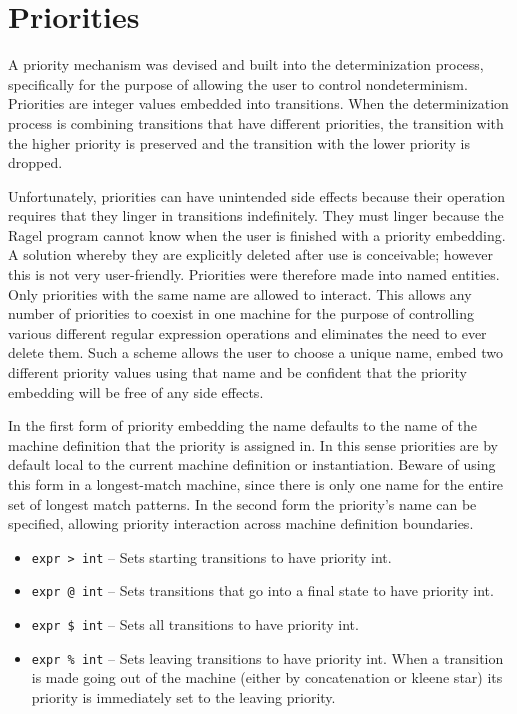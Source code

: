 \documentclass[letterpaper,11pt,oneside]{book}
\begin{document}
\section{Priorities}

A priority mechanism was devised and built into the determinization
process, specifically for the purpose of allowing the user to control
nondeterminism.  Priorities are integer values embedded into transitions. When
the determinization process is combining transitions that have different
priorities, the transition with the higher priority is preserved and the
transition with the lower priority is dropped.

Unfortunately, priorities can have unintended side effects because their
operation requires that they linger in transitions indefinitely. They must linger
because the Ragel program cannot know when the user is finished with a priority
embedding.  A solution whereby they are explicitly deleted after use is
conceivable; however this is not very user-friendly.  Priorities were therefore
made into named entities. Only priorities with the same name are allowed to
interact.  This allows any number of priorities to coexist in one machine for
the purpose of controlling various different regular expression operations and
eliminates the need to ever delete them. Such a scheme allows the user to
choose a unique name, embed two different priority values using that name
and be confident that the priority embedding will be free of any side effects.

In the first form of priority embedding the name defaults to the name of the machine
definition that the priority is assigned in. In this sense priorities are by
default local to the current machine definition or instantiation. Beware of
using this form in a longest-match machine, since there is only one name for
the entire set of longest match patterns. In the second form the priority's
name can be specified, allowing priority interaction across machine definition
boundaries.

\begin{itemize}
\item \verb|expr > int| -- Sets starting transitions to have priority int.
\item \verb|expr @ int| -- Sets transitions that go into a final state to have priority int. 
\item \verb|expr $ int| -- Sets all transitions to have priority int.
\item \verb|expr % int| -- Sets leaving transitions to
have priority int. When a transition is made going out of the machine (either
by concatenation or kleene star) its priority is immediately set to the 
leaving priority.  
\end{itemize}
\end{document}
